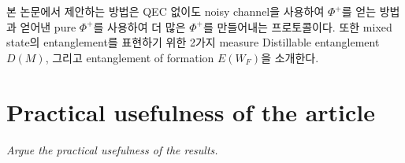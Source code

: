 \documentclass[
]{kaohandt}
\begin{document}
본 논문에서 제안하는 방법은 QEC 없이도 noisy channel을 사용하여 $\Phi^+$를 얻는 방법과 얻어낸 pure $\Phi^+$를 사용하여 더 많은 $\Phi^+$를 만들어내는 프로토콜이다. 또한 mixed state의 entanglement를 표현하기 위한 2가지 measure Distillable entanglement $D(M)$, 그리고 entanglement of formation $E(W_F)$을 소개한다.
\section{Practical usefulness of the article}
\begin{kaobox}
    \textit{Argue the practical usefulness of the results.}
\end{kaobox}




\printbibliography[title=Bibliography] %
\end{document}
